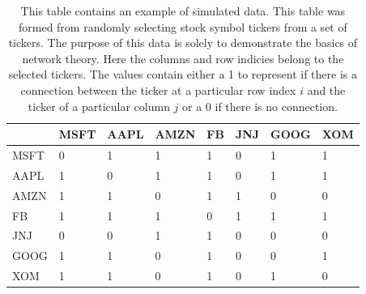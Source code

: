 \begin{table}[htbp]
\begin{center}
    \begin{tabular}{|p{2cm}|p{1.5cm}|p{1.5cm}|p{1.5cm}|p{1.5cm}|p{1.5cm}|p{1.5cm}|p{1.5cm}|  }
        \hline
         & MSFT & AAPL & AMZN & FB & JNJ &  GOOG & XOM\\
        \hline
        MSFT  & 0 & 1 & 1 & 1  & 0 & 1 & 1 \\
        \hline
        AAPL & 1& 0 & 1 & 1 & 0 & 1 & 1 \\
        \hline
        AMZN & 1 & 1 & 0 & 1 & 1  & 0 & 0 \\
        \hline
        FB & 1 & 1 & 1 & 0  & 1 & 1 & 1 \\
        \hline
        JNJ & 0 & 0 & 1 & 1 & 0 & 0 & 0  \\ 
        \hline
        GOOG & 1 & 1 & 0 & 1 & 0 & 0 & 1 \\
        \hline
        XOM & 1 & 1 & 0 & 1 & 0 & 1 & 0  \\
        \hline
    \end{tabular}
\end{center}
\caption{ 
      This table contains an example of simulated data. This table was formed from randomly selecting stock symbol tickers from a set of tickers. The purpose of this data is solely to demonstrate the basics of network theory. Here the columns and row indicies belong to the selected tickers. The values contain either a 1 to represent if there is a connection between the ticker at a particular row index \(i\)  and the ticker of a particular column \(j\) or a 0 if there is no connection.
}

\label{tab:ExampleTable}
\end{table}

